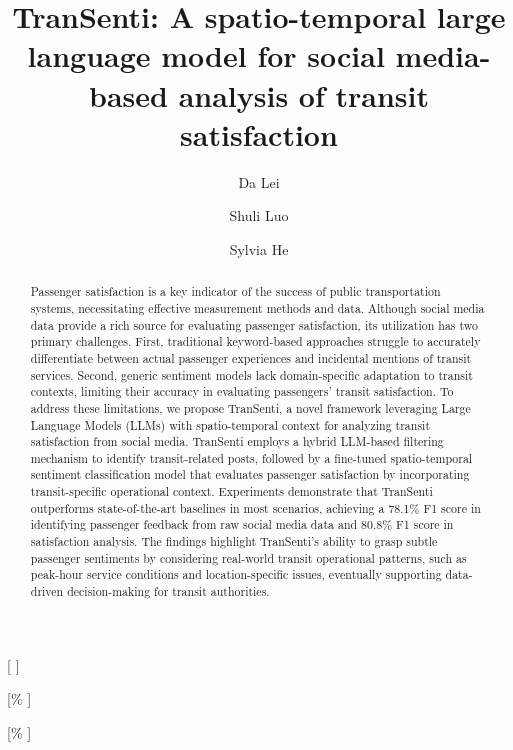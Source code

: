 \documentclass[a4paper,fleqn,12pt]{cas-sc}
\begin{document}
\let\WriteBookmarks\relax
\def\floatpagepagefraction{1}
\def\textpagefraction{.001}

\title [mode = title]{TranSenti: A spatio-temporal large language model for social media-based analysis of transit satisfaction} 

\author[1]{Da Lei}[%
]

\address[1]{Department of Geography and Resource Management, The Chinese University of Hong Kong, Hong Kong, China}
\address[2]{School of Humanities and Social Science, The Chinese University of Hong Kong, Shenzhen, China}

\author[2]{Shuli Luo}[\%
]

\author[1]{Sylvia He}[\%
]
\cormark[1]




\begin{abstract}
Passenger satisfaction is a key indicator of the success of public transportation systems, necessitating effective measurement methods and data. Although social media data provide a rich source for evaluating passenger satisfaction, its utilization has two primary challenges. First, traditional keyword-based approaches struggle to accurately differentiate between actual passenger experiences and incidental mentions of transit services. Second, generic sentiment models lack domain-specific adaptation to transit contexts, limiting their accuracy in evaluating passengers' transit satisfaction. To address these limitations, we propose TranSenti, a novel framework leveraging Large Language Models (LLMs) with spatio-temporal context for analyzing transit satisfaction from social media. TranSenti employs a hybrid LLM-based filtering mechanism to identify transit-related posts, followed by a fine-tuned spatio-temporal sentiment classification model that evaluates passenger satisfaction by incorporating transit-specific operational context. Experiments demonstrate that TranSenti outperforms state-of-the-art baselines in most scenarios, achieving a 78.1\% F1 score in identifying passenger feedback from raw social media data and 80.8\% F1 score in satisfaction analysis. The findings highlight TranSenti's ability to grasp subtle passenger sentiments by considering real-world transit operational patterns, such as peak-hour service conditions and location-specific issues, eventually supporting data-driven decision-making for transit authorities.
\end{abstract}
\end{document}
